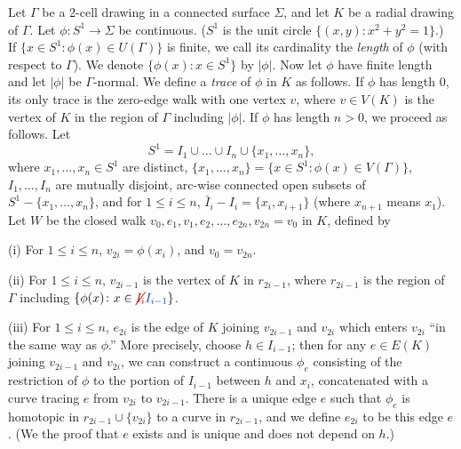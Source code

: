 
Let $\Gamma$ be a 2-cell drawing in a connected surface $\Sigma$, and let $K$ be a radial drawing of $\Gamma$. Let $\phi \colon S^1 \to \Sigma$ be continuous. ($S^1$ is the unit circle $\{(x, y) \colon x^2 + y^2 = 1\}$.) If $\{x \in S^1 \colon \phi(x) \in U(\Gamma)\}$ is finite, we call its cardinality the \textit{length} of $\phi$ (with respect to $\Gamma$). We denote $\{\phi(x) \colon x \in S^1\}$ by $|\phi|$. Now let $\phi$ have finite length and let $|\phi|$ be $\Gamma$-normal. We define a \textit{trace} of $\phi$ in $K$ as follows. If $\phi$ has length 0, its only trace is the zero-edge walk with one vertex $v$, where $v \in V(K)$ is the vertex of $K$ in the region of $\Gamma$ including $|\phi|$. If $\phi$ has length $n > 0$, we proceed as follows. Let
\begin{equation*}
S^1 = I_1 \cup \dots \cup I_n \cup \{x_1, \dots, x_n\},
\end{equation*}
where $x_1, \dots, x_n \in S^1$ are distinct, $\{x_1, \dots, x_n\} = \{x \in S^1 \colon \phi(x) \in V(\Gamma)\}$, $I_1, \dots, I_n$ are mutually disjoint, arc-wise connected open subsets of $S^1 - \{x_1, \dots, x_n\}$, and for $1 \le i \le n$, $\bar{I}_i - I_i = \{x_i, x_{i+1}\}$ (where $x_{n+1}$ means $x_1$). Let $W$ be the closed walk $v_0, e_1, v_1, e_2, \dots, e_{2n}, v_{2n} = v_0$ in $K$, defined by

\hspace*{12pt}(i) For $1 \le i \le n$, $v_{2i} = \phi(x_i)$, and $v_0 = v_{2n}$.

\hspace*{12pt}(ii) For $1 \le i \le n$, $v_{2i-1}$ is the vertex of $K$ in $r_{2i-1}$, where $r_{2i-1}$ is the region of $\Gamma$ including $\{\phi(x) \colon x \in \delm{I_i}\fix{I_{i-1}}\}$.

\hspace*{12pt}(iii) For $1 \le i \le n$, $e_{2i}$ is the edge of $K$ joining $v_{2i-1}$ and $v_{2i}$ which enters $v_{2i}$ ``in the same way as $\phi$.'' More precisely, choose $h \in I_{i-1}$; then for any $e \in E(K)$ joining $v_{2i-1}$ and $v_{2i}$, we can construct a continuous $\phi_e$ consisting of the restriction of $\phi$ to the portion of $I_{i-1}$ between $h$ and $x_i$, concatenated with a curve tracing $e$ from $v_{2i}$ to $v_{2i-1}$. There is a unique edge $e$ such that $\phi_e$ is homotopic in $r_{2i-1} \cup \{v_{2i}\}$ to a curve in $r_{2i-1}$, and we define $e_{2i}$ to be this edge $e$. (We  the proof that $e$ exists and is unique and does not depend on $h$.)

